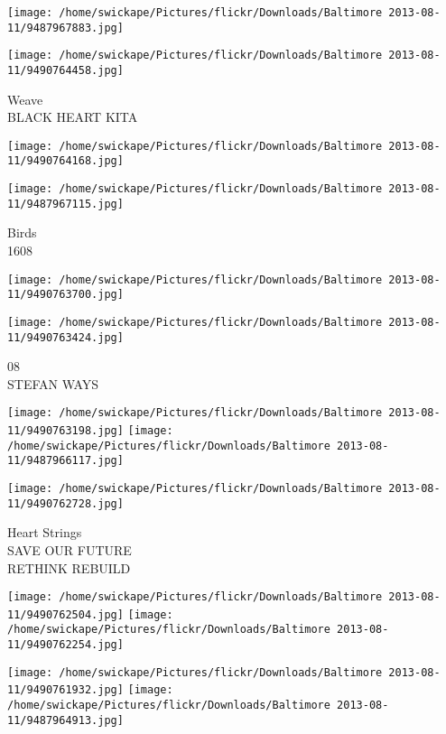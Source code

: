 \documentclass[10pt,letterpaper]{article}
\begin{document}
\texttt{[image: /home/swickape/Pictures/flickr/Downloads/Baltimore 2013-08-11/9487967883.jpg]}

\vspace{0.25in}
\texttt{[image: /home/swickape/Pictures/flickr/Downloads/Baltimore 2013-08-11/9490764458.jpg]}

Weave\\
BLACK HEART KITA\\
\pagebreak

\texttt{[image: /home/swickape/Pictures/flickr/Downloads/Baltimore 2013-08-11/9490764168.jpg]}

\vspace{0.25in}
\texttt{[image: /home/swickape/Pictures/flickr/Downloads/Baltimore 2013-08-11/9487967115.jpg]}

Birds\\
1608\\
\pagebreak

\texttt{[image: /home/swickape/Pictures/flickr/Downloads/Baltimore 2013-08-11/9490763700.jpg]}

\vspace{0.25in}
\texttt{[image: /home/swickape/Pictures/flickr/Downloads/Baltimore 2013-08-11/9490763424.jpg]}

08\\
STEFAN WAYS\\
\pagebreak

\texttt{[image: /home/swickape/Pictures/flickr/Downloads/Baltimore 2013-08-11/9490763198.jpg]}
\texttt{[image: /home/swickape/Pictures/flickr/Downloads/Baltimore 2013-08-11/9487966117.jpg]}

\vspace{0.25in}
\texttt{[image: /home/swickape/Pictures/flickr/Downloads/Baltimore 2013-08-11/9490762728.jpg]}

Heart Strings\\
SAVE OUR FUTURE\\
RETHINK REBUILD\\
\pagebreak

\texttt{[image: /home/swickape/Pictures/flickr/Downloads/Baltimore 2013-08-11/9490762504.jpg]}
\texttt{[image: /home/swickape/Pictures/flickr/Downloads/Baltimore 2013-08-11/9490762254.jpg]}

\texttt{[image: /home/swickape/Pictures/flickr/Downloads/Baltimore 2013-08-11/9490761932.jpg]}
\texttt{[image: /home/swickape/Pictures/flickr/Downloads/Baltimore 2013-08-11/9487964913.jpg]}
\end{document}
